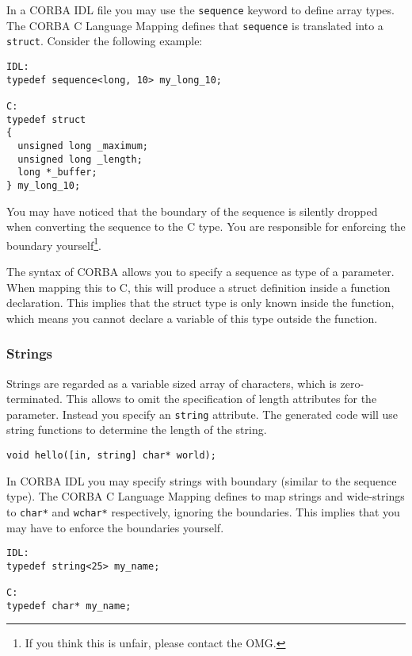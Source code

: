 In a CORBA IDL file you may use the {\tt sequence} keyword to define
array types. The CORBA C Language Mapping defines that {\tt sequence}
is translated into a {\tt struct}. Consider the following example:
\begin{verbatim}
IDL:
typedef sequence<long, 10> my_long_10;

C:
typedef struct
{
  unsigned long _maximum;
  unsigned long _length;
  long *_buffer;
} my_long_10;
\end{verbatim}

You may have noticed that the boundary of the sequence is silently dropped
when converting the sequence to the C type. You are responsible for enforcing
the boundary yourself\footnote{If you think this is unfair, please contact the
OMG.}.

The syntax of CORBA allows you to specify a sequence as type of a parameter.
When mapping this to C, this will produce a struct definition inside a
function declaration. This implies that the struct type is only known inside
the function, which means you cannot declare a variable of this type outside
the function.

\subsubsection{Strings}
Strings are regarded as a variable sized array of characters, which is 
zero-terminated.
This allows to omit the specification of length attributes for the 
parameter. Instead you specify an \verb|string| attribute. The generated
code will use string functions to determine the length of the string.

\begin{verbatim}
void hello([in, string] char* world);
\end{verbatim}

In CORBA IDL you may specify strings with boundary (similar to the sequence
type). The CORBA C Language Mapping defines to map strings and wide-strings
to \verb|char*| and \verb|wchar*| respectively, ignoring the boundaries. This
implies that you may have to enforce the boundaries yourself.

\begin{verbatim}
IDL:
typedef string<25> my_name;

C:
typedef char* my_name;
\end{verbatim}

